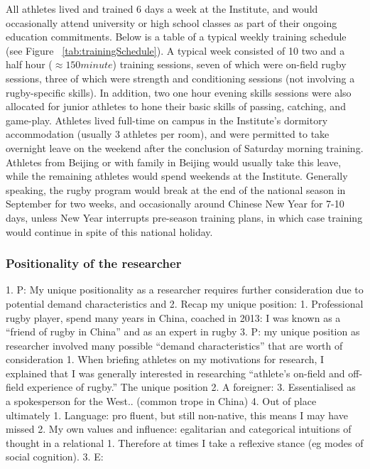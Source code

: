 \begin{CJK}{UTF8}{gbsn}
All athletes lived and trained 6 days a week at the Institute, and would occasionally attend university or high school classes as part of their ongoing education commitments.  Below is a table of a typical weekly training schedule (see Figure ~\ref{tab:trainingSchedule}). A typical week consisted of 10 two and a half hour ($\approx 150 minute$) training sessions, seven of which were on-field rugby sessions, three of which were strength and conditioning sessions (not involving a rugby-specific skills).  In addition, two one hour evening skills sessions were also allocated for junior athletes to hone their basic skills of passing, catching, and game-play.  Athletes lived full-time on campus in the Institute's dormitory accommodation (usually 3 athletes per room), and were permitted to take overnight leave on the weekend after the conclusion of Saturday morning training.  Athletes from Beijing or with family in Beijing would usually take this leave, while the remaining athletes would spend weekends at the Institute.  Generally speaking, the rugby program would break at the end of the national season in September for two weeks, and occasionally around Chinese New Year for 7-10 days, unless New Year interrupts pre-season training plans, in which case training would continue in spite of this national holiday.

\subsubsection{Positionality of the researcher}
        1. P: My unique positionality as a researcher requires further consideration due to potential demand characteristics and
        2. Recap my unique position:
            1. Professional rugby player, spend many years in China, coached in 2013: I was known as a “friend of rugby in China” and as an expert in rugby
        3. P: my unique position as researcher involved many possible “demand characteristics” that are worth of consideration
            1. When briefing athletes on my motivations for research, I explained that I was generally interested in researching ``athlete's on-field and off-field experience of rugby.''  The unique position
            2. A foreigner:
            3. Essentialised as  a spokesperson for the West.. (common trope in China)
            4. Out of place ultimately
        1. Language: pro fluent, but still non-native, this means I may have missed
        2. My own values and influence: egalitarian and categorical intuitions of thought in a relational
            1. Therefore at times I take a reflexive stance (eg modes of social cognition).
        3. E:




\end{CJK}
